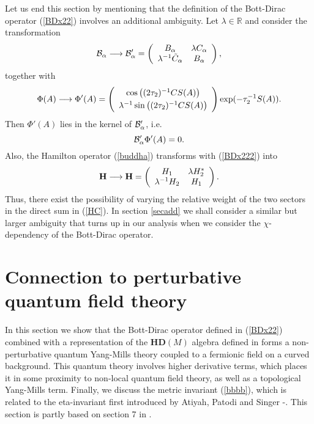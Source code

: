 \documentclass[letterpaper,11pt]{article}
\newcommand{\nn}{\nonumber}
\def\a{\alpha}
\def\cb{{\cal B}}
\begin{document}
Let us end this section by mentioning that the definition of the Bott-Dirac operator (\ref{BDx22}) involves an additional ambiguity. Let $\lambda\in\mathbb{R}$ and consider the transformation
\begin{eqnarray}
\cb_{\a} \longrightarrow  \cb'_{\a}=    \left(
\begin{array}{cc}
 B_\a  & \lambda C_\a \\ 
\lambda^{-1} \tilde{C}_\a    &  B_\a
\end{array}
\right),
\label{BDx222}
\end{eqnarray}
together with 
\begin{equation}
 \Phi (A) \longrightarrow  \Phi' (A) = \left(
\begin{array}{c}
\cos \left( ({2\tau_2})^{-1}  CS(A)\right)  
\vspace{0,1cm}
\\
\lambda^{-1} \sin\left( ({2\tau_2})^{-1}  CS(A)\right)  
\end{array}
\right)  \exp(-\tau_2^{-1}S(A)).
\nn
\end{equation}
Then $ \Phi' (A)$ lies in the kernel of $\cb_\a'$, i.e.
\begin{equation}
\cb'_{\a} \Phi'(A) = 0.
\nn
\end{equation}
Also, the Hamilton operator (\ref{buddha}) transforms with (\ref{BDx222}) into
\begin{eqnarray}
{\bf H}\longrightarrow {\bf H}=
\left(
\begin{array}{cc}
H_{1}  &  \lambda H^*_{2} \\
 \lambda^{-1} {H}_2 &  {H}_{1} 
\end{array}
\right).
\nn
\end{eqnarray}
Thus, there exist the possibility of varying the relative weight of the two sectors in the direct sum in (\ref{HC}). In section \ref{secadd} we shall consider a similar but larger ambiguity that turns up in our analysis when we consider the $\chi$-dependency of the Bott-Dirac operator.








\section{Connection to perturbative quantum field theory}
\label{conqft}

In this section we show that the Bott-Dirac operator defined in (\ref{BDx22}) combined with a representation of the $\mathbf{HD}(M)$ algebra defined in \cite{Aastrup:2012vq,AGnew} forms a non-perturbative quantum Yang-Mills theory coupled to a fermionic field on a curved background. This quantum theory involves higher derivative terms, which places it in some proximity to non-local quantum field theory, as well as a topological Yang-Mills term. Finally, we discuss the metric invariant (\ref{bbbb}), which is related to the eta-invariant first introduced by Atiyah, Patodi and Singer \cite{Atiyah}-\cite{AtiyahIII}.
This section is partly based on section 7 in \cite{Aastrup:2019yui}.
\end{document}
